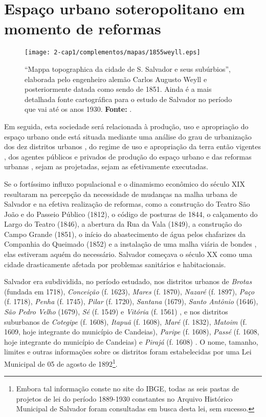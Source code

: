 \section{Espaço urbano soteropolitano em momento de reformas}\label{sec:1.4}

\begin{figure}[!htp]
\centering
\texttt{[image: 2-cap1/complementos/mapas/1855weyll.eps]} 
\caption{``Mappa topographica da cidade de S. Salvador e seus subúrbios'', elaborada pelo engenheiro alemão Carlos Augusto Weyll e posteriormente datada como sendo de 1851. Ainda é a mais detalhada fonte cartográfica para o estudo de Salvador no período que vai até os anos 1930. \textbf{Fonte:} .}
\end{figure}

Em seguida, esta sociedade será relacionada à produção, uso e apropriação do espaço urbano onde está situada mediante uma análise do grau de urbanização dos dez distritos urbanos \cite{NASCIMENTO2007, VASCONCELOS2002}, do regime de uso e apropriação da terra então vigentes \cite{CEDURB1978}, dos agentes públicos e privados de produção do espaço urbano e das reformas urbanas \cite{cardoso_vilas_1991, CUNHA2011}, sejam as projetadas, sejam as efetivamente executadas.

Se o fortíssimo influxo populacional e o dinamismo econômico do século XIX resultaram na percepção da necessidade de mudanças na malha urbana de Salvador e na efetiva realização de reformas, como a construção do Teatro São João e do Passeio Público (1812), o código de posturas de 1844, o calçamento do Largo do Teatro (1846), a abertura da Rua da Vala (1849), a construção do Campo Grande (1851), o início do abastecimento de água pelos chafarizes da Companhia do Queimado (1852) e a instalação de uma malha viária de bondes \cite{fernandesgomes1992, fernandessampaiogomes1999, NASCIMENTO2007, sampaio_50_2005}, elas estiveram aquém do necessário. Salvador começava o século XX como uma cidade drasticamente afetada por problemas sanitários e habitacionais.

Salvador era subdividida, no período estudado, nos distritos urbanos de \textit{Brotas} (fundada em 1718), \textit{Conceição} (f. 1623), \textit{Mares} (f. 1870), \textit{Nazaré} (f. 1897), \textit{Paço} (f. 1718), \textit{Penha} (f. 1745), \textit{Pilar} (f. 1720), \textit{Santana} (1679), \textit{Santo Antônio }(1646), \textit{São Pedro Velho} (1679), \textit{Sé} (f. 1549) e \textit{Vitória} (f. 1561) \cite[259-307]{VASCONCELOS2002}, e nos distritos suburbanos de \textit{Cotegipe} (f. 1608), \textit{Itapuã} (f. 1608), \textit{Maré} (f. 1832), \textit{Matoim} (f. 1609, hoje integrante do município de Candeias), \textit{Paripe} (f. 1608), \textit{Passé} (f. 1608, hoje integrante do município de Candeias) e \textit{Pirajá} (f. 1608) \cite[p.~53-62]{NASCIMENTO2007}. O nome, tamanho, limites e outras informações sobre os distritos foram estabelecidas por uma Lei Municipal de 05 de agosto de 1892\footnote{Embora tal informação conste no site do IBGE, todas as seis pastas de projetos de lei do período 1889-1930 constantes no Arquivo Histórico Municipal de Salvador foram consultadas em busca desta lei, sem sucesso.}.

